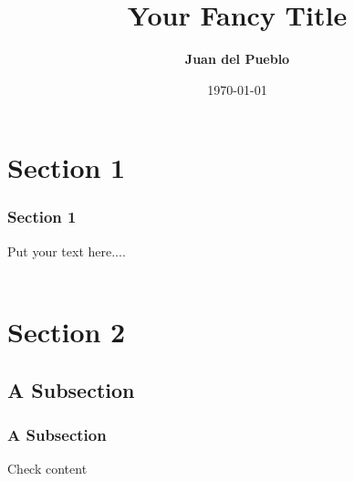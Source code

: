 \documentclass{beamer}
\title[NCATS Linux Team]{\textbf{Your Fancy Title}}
\author{\textbf{Juan del Pueblo}}
\institute[NCATS]
{
\textbf{Your Team} \\
\medskip
\textit{\textbf{(username@mail.nih.gov)}}
}
\date{\today}
\begin{document}

\begin{frame}
\titlepage
\end{frame}

\usebackgroundtemplate{}

\justifying

\section{Section 1}
\begin{frame} 
\frametitle{\textbf{Section 1}}
\justifying
Put your text here....
\\~\\
\pause  
\end{frame}


\section{Section 2}

\subsection{A Subsection}
\begin{frame}
\frametitle{\textbf{A Subsection}}
Check content
\end{frame}
\end{document}
